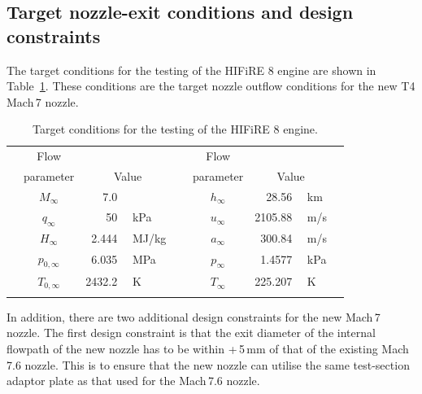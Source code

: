 \documentclass[12pt,a4paper]{article}
\begin{document}
\subsection{Target nozzle-exit conditions and design constraints}
\label{sec:nozzle-design:target-conds-and-constraints}
%
The target conditions for the testing of the HIFiRE 8 engine are shown in 
Table~\ref{t:flight-test-conds}. These conditions are the target nozzle
outflow conditions for the new T4 Mach\,7 nozzle. 
%
\begin{table}[htbp]
 \begin{small}
  \begin{center}
  \caption{Target conditions for the testing of the HIFiRE 8 engine.}
  \label{t:flight-test-conds}
  \vspace{2mm}
  \begin{tabular}{@{}c@{}@{}c@{}@{}r@{}@{}l@{}|@{}c@{}@{}c@{}@{}r@{}@{}l@{}@{}c@{}}%
  \hline\hline\noalign{\smallskip}
  \hspace{5mm} & Flow      &             &              & \hspace{5mm} & Flow      &             &             & \hspace{5mm} \\
               & parameter & \multicolumn{2}{c|}{Value} &              & parameter & \multicolumn{2}{c}{Value} &              \\
  \noalign{\smallskip}\hline\noalign{\smallskip}
  & $M_\infty$     & 7.0    &                & & $h_\infty$  & 28.56   & \,\,km  & \\
  & $q_\infty$     & 50     & \,\,kPa        & & $u_\infty$  & 2105.88 & \,\,m/s & \\
  & $H_\infty$     & 2.444  & \,\,MJ/kg\,\,  & & $a_\infty$  & 300.84  & \,\,m/s & \\
  & $p_{0,\infty}$ & 6.035  & \,\,MPa        & & $p_\infty$  & 1.4577  & \,\,kPa & \\
  & $T_{0,\infty}$ & 2432.2 & \,\,K          & & $T_\infty$  & 225.207 & \,\,K   & \\
  \noalign{\smallskip}\hline\hline
  \end{tabular}
  \end{center}
 \end{small}
\end{table}
%

In addition, there are two additional design constraints for the new Mach\,7 
nozzle. The first design constraint is that the exit diameter of the internal 
flowpath of the new nozzle has to be within +\,5\,mm of that of the existing 
Mach\,7.6 nozzle. This is to ensure that the new nozzle can utilise the same 
test-section adaptor plate as that used for the Mach\,7.6 nozzle.
\end{document}
